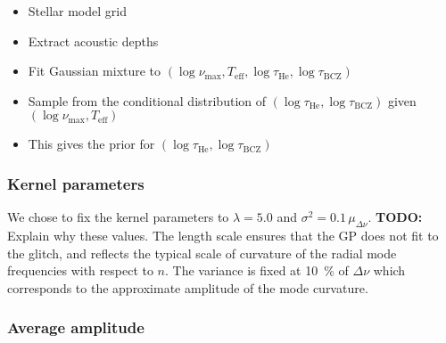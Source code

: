 \documentclass[linenumbers,modern]{aastex631dm}
\newcommand{\helium}{\mathrm{He}}
\newcommand{\bcz}{\mathrm{BCZ}}
\newcommand{\todo}[1]{{\color{todo} \textbf{TODO:} #1}}
\begin{document}
\begin{itemize}
    \item Stellar model grid
    \item Extract acoustic depths
    \item Fit Gaussian mixture to \((\log\nu_\mathrm{max}, T_\mathrm{eff},
        \log\tau_\helium, \log\tau_\bcz)\)
    \item Sample from the conditional distribution of \((\log\tau_\helium,
        \log\tau_\bcz)\) given \((\log\nu_\mathrm{max}, T_\mathrm{eff})\)
    \item This gives the prior for \((\log\tau_\helium, \log\tau_\bcz)\)
\end{itemize}


\subsubsection{Kernel parameters}\label{sec:kernel-params}

We chose to fix the kernel parameters to \(\lambda = 5.0\) and \(\sigma^2 =
0.1 \, \mu_{\Delta\nu}\). \todo{Explain why these values.} The length scale ensures that the
GP does not fit to the glitch, and reflects the typical scale of curvature of
the radial mode frequencies with respect to \(n\). The variance is fixed at
\SI{10}{\percent} of \(\Delta\nu\) which corresponds to the approximate
amplitude of the mode curvature.


\subsubsection{Average amplitude}\label{sec:avg-amp}
\end{document}
